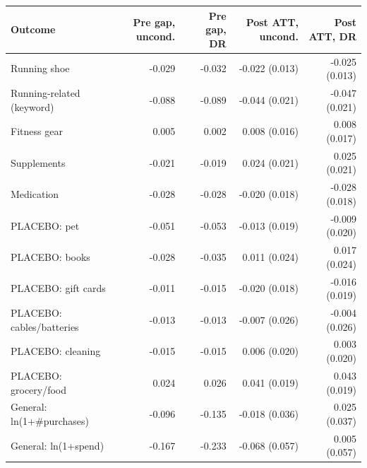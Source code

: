 \begin{tabular}{lrrrr}
\toprule
Outcome & Pre gap, uncond. & Pre gap, DR & Post ATT, uncond. & Post ATT, DR \\
\midrule
Running shoe & -0.029 & -0.032 & -0.022 (0.013) & -0.025 (0.013) \\
Running-related (keyword) & -0.088 & -0.089 & -0.044 (0.021) & -0.047 (0.021) \\
Fitness gear & 0.005 & 0.002 & 0.008 (0.016) & 0.008 (0.017) \\
Supplements & -0.021 & -0.019 & 0.024 (0.021) & 0.025 (0.021) \\
Medication & -0.028 & -0.028 & -0.020 (0.018) & -0.028 (0.018) \\
PLACEBO: pet & -0.051 & -0.053 & -0.013 (0.019) & -0.009 (0.020) \\
PLACEBO: books & -0.028 & -0.035 & 0.011 (0.024) & 0.017 (0.024) \\
PLACEBO: gift cards & -0.011 & -0.015 & -0.020 (0.018) & -0.016 (0.019) \\
PLACEBO: cables/batteries & -0.013 & -0.013 & -0.007 (0.026) & -0.004 (0.026) \\
PLACEBO: cleaning & -0.015 & -0.015 & 0.006 (0.020) & 0.003 (0.020) \\
PLACEBO: grocery/food & 0.024 & 0.026 & 0.041 (0.019) & 0.043 (0.019) \\
General: ln(1+\#purchases) & -0.096 & -0.135 & -0.018 (0.036) & 0.025 (0.037) \\
General: ln(1+spend) & -0.167 & -0.233 & -0.068 (0.057) & 0.005 (0.057) \\
\bottomrule
\end{tabular}
